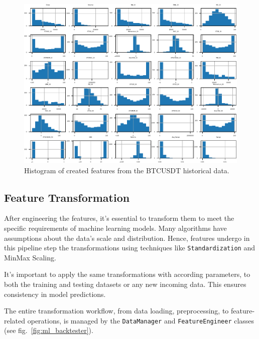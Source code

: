 \begin{figure}[h]
\centering
\begin{adjustbox}{max width=1\textwidth,center}
    \includegraphics[scale=1]{./pdf/dataset_histogram.pdf}
\end{adjustbox}
\caption{Histogram of created features from the BTCUSDT historical data.}
\label{fig:dataset_histogram}
\end{figure}

\subsection{Feature Transformation}

After engineering the features, it's essential to transform them to meet the specific requirements of machine learning models.
Many algorithms have assumptions about the data's scale and distribution.
Hence, features undergo in this pipeline step the transformations using techniques like \texttt{Standardization} and {MinMax Scaling}.

It's important to apply the same transformations with according parameters, to both the training and testing datasets or any new incoming data.
This ensures consistency in model predictions.

The entire transformation workflow, from data loading, preprocessing, to feature-related operations, is managed by the \texttt{DataManager} and \texttt{FeatureEngineer} classes (see fig.~\ref{fig:ml_backtester}).

